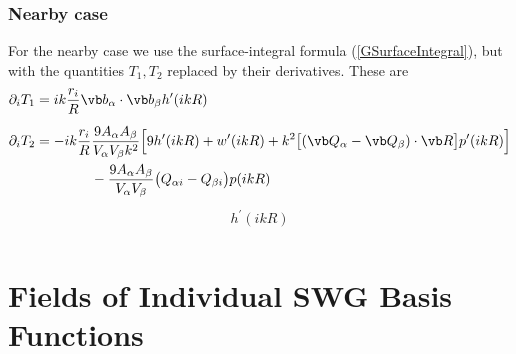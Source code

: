 \documentclass[letterpaper]{article}
\begin{document}
\subsubsection*{Nearby case}
 
For the nearby case we use the surface-integral formula
(\ref{GSurfaceIntegral}), but with the quantities $T_1, T_2$ 
replaced by their derivatives. These are 
\begin{align*}
 \partial_i T_1 
&= 
 ik \frac{r_i}{R} \vb b_\alpha \cdot \vb b_\beta h^\prime(ikR)
\\[5pt]
 \partial_i T_2 
&= -ik\frac{r_i}{R}\frac{9A_\alpha A_\beta }{V_\alpha V_\beta k^2}
    \Big[  9h^\prime(ikR) 
          + w^\prime(ikR) 
          + k^2\big[(\vb Q_\alpha - \vb Q_\beta)\cdot \vb R\big]p^\prime(ikR)
    \Big]
\\
&\qquad \qquad 
   -\frac{9A_\alpha A_\beta}{V_\alpha V_\beta}
    \big( Q_{\alpha i}- Q_{\beta i} \big) p(ikR)
\end{align*}
\begin{align*}
 h^\prime(ikR) \\
\end{align*}

\newpage
\section{Fields of Individual SWG Basis Functions}
\end{document}
